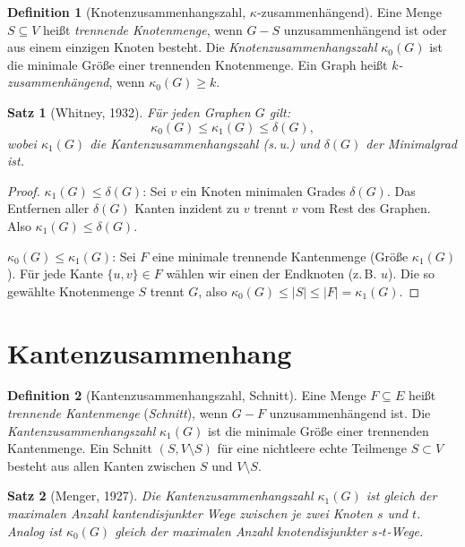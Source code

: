 ﻿\documentclass[a4paper,12pt,openany,oneside]{book}
\theoremstyle{definition}
\newtheorem{definition}{Definition}[chapter]
\theoremstyle{plain}
\newtheorem{satz}{Satz}[chapter]
\theoremstyle{remark}
\begin{document}
\begin{definition}[Knotenzusammenhangszahl, $\kappa$-zusammenh\"angend]
  Eine Menge $S \subseteq V$ hei\ss{}t \emph{trennende Knotenmenge}, wenn
  $G - S$ unzusammenh\"angend ist oder aus einem einzigen Knoten besteht.
  Die \emph{Knotenzusammenhangszahl} $\kappa_0(G)$ ist die minimale
  Gr\"o\ss{}e einer trennenden Knotenmenge. Ein Graph hei\ss{}t
  \emph{$k$-zusammenh\"angend}, wenn $\kappa_0(G) \geq k$.
\end{definition}

\begin{satz}[Whitney, 1932]
  F\"ur jeden Graphen $G$ gilt:
  \[
    \kappa_0(G) \leq \kappa_1(G) \leq \delta(G),
  \]
  wobei $\kappa_1(G)$ die Kantenzusammenhangszahl (s.\,u.) und $\delta(G)$
  der Minimalgrad ist.
\end{satz}

\begin{proof}
  \emph{$\kappa_1(G) \leq \delta(G)$}: Sei $v$ ein Knoten minimalen Grades
  $\delta(G)$. Das Entfernen aller $\delta(G)$ Kanten inzident zu $v$
  trennt $v$ vom Rest des Graphen. Also $\kappa_1(G) \leq \delta(G)$.

  \emph{$\kappa_0(G) \leq \kappa_1(G)$}: Sei $F$ eine minimale trennende
  Kantenmenge (Gr\"o\ss{}e $\kappa_1(G)$). F\"ur jede Kante $\{u,v\} \in F$
  w\"ahlen wir einen der Endknoten (z.\,B. $u$). Die so gew\"ahlte Knotenmenge
  $S$ trennt $G$, also $\kappa_0(G) \leq |S| \leq |F| = \kappa_1(G)$.
\end{proof}

\section{Kantenzusammenhang}

\begin{definition}[Kantenzusammenhangszahl, Schnitt]
  Eine Menge $F \subseteq E$ hei\ss{}t \emph{trennende Kantenmenge}
  (\emph{Schnitt}), wenn $G - F$ unzusammenh\"angend ist. Die
  \emph{Kantenzusammenhangszahl} $\kappa_1(G)$ ist die minimale Gr\"o\ss{}e
  einer trennenden Kantenmenge. Ein Schnitt $(S, V \setminus S)$ f\"ur eine
  nichtleere echte Teilmenge $S \subset V$ besteht aus allen Kanten zwischen
  $S$ und $V \setminus S$.
\end{definition}

\begin{satz}[Menger, 1927]
  Die Kantenzusammenhangszahl $\kappa_1(G)$ ist gleich der maximalen Anzahl
  kantendisjunkter Wege zwischen je zwei Knoten $s$ und $t$. Analog ist
  $\kappa_0(G)$ gleich der maximalen Anzahl knotendisjunkter $s$-$t$-Wege.
\end{satz}
\end{document}

